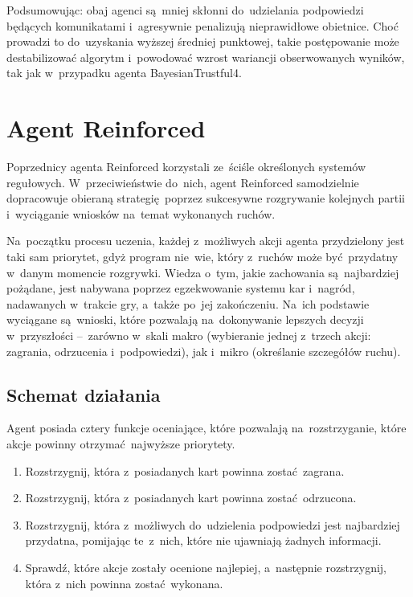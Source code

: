 \documentclass[declaration,shortabstract,inz]{iithesis}
\begin{document}
Podsumowując: obaj agenci są~mniej skłonni do~udzielania podpowiedzi będących komunikatami i~agresywnie penalizują nieprawidłowe obietnice. Choć prowadzi to do~uzyskania wyższej średniej punktowej, takie postępowanie może destabilizować algorytm i~powodować wzrost wariancji obserwowanych wyników, tak jak w~przypadku agenta BayesianTrustful4.

\section{Agent Reinforced}

Poprzednicy agenta Reinforced korzystali ze~ściśle określonych systemów regułowych. W~przeciwieństwie do~nich, agent Reinforced samodzielnie dopracowuje obieraną strategię poprzez sukcesywne rozgrywanie kolejnych partii i~wyciąganie wniosków na~temat wykonanych ruchów.

Na~początku procesu uczenia, każdej z~możliwych akcji agenta przydzielony jest taki sam priorytet, gdyż program nie~wie, który z~ruchów może być przydatny w~danym momencie rozgrywki. Wiedza o~tym, jakie zachowania są~najbardziej pożądane, jest nabywana poprzez egzekwowanie systemu kar i~nagród, nadawanych w~trakcie gry, a~także po~jej zakończeniu. Na~ich podstawie wyciągane są~wnioski, które pozwalają na~dokonywanie lepszych decyzji w~przyszłości --~zarówno w~skali makro (wybieranie jednej z~trzech akcji: zagrania, odrzucenia i~podpowiedzi), jak i~mikro (określanie szczegółów ruchu).

\subsection*{Schemat działania}

Agent posiada cztery funkcje oceniające, które pozwalają na~rozstrzyganie, które akcje powinny otrzymać najwyższe priorytety.

\begin{enumerate}
	\item Rozstrzygnij, która z~posiadanych kart powinna zostać zagrana.
	\item Rozstrzygnij, która z~posiadanych kart powinna zostać odrzucona.
	\item Rozstrzygnij, która z~możliwych do~udzielenia podpowiedzi jest najbardziej przydatna, pomijając te~z~nich, które nie ujawniają żadnych informacji.
	\item Sprawdź, które akcje zostały ocenione najlepiej, a~następnie rozstrzygnij, która z~nich powinna zostać wykonana.
\end{enumerate}
\end{document}
